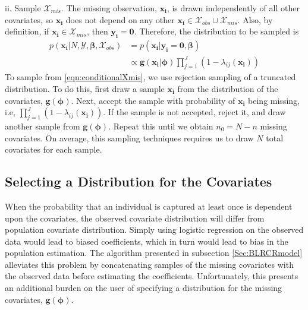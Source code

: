 \documentclass[
  12pt,
]{article}
\begin{document}
\begin{list}{}{}
\begin{list}{}{}
  
  \item[ii.] Sample $\mathcal{X}_{mis}$.   The missing observation, $\boldsymbol{x_i}$, is drawn independently of all other covariates, so $\boldsymbol{x_i}$ does not depend on any other $\boldsymbol{x_i} \in \mathcal{X}_{obs}\cup \mathcal{X}_{mis} $.  Also, by definition, if $\boldsymbol{x_i} \in \mathcal{X}_{mis}$, then $\boldsymbol{y_i} = \boldsymbol{0}$. Therefore, the distribution to be sampled is
  \begin{align}
  \label{eqn:conditionalXmis}
  \nonumber p(\boldsymbol{x_i}|N,\mathcal{Y},\boldsymbol{\beta},\mathcal{X}_{obs})&=p(\boldsymbol{x_i} |\boldsymbol{y_i}=\boldsymbol{0},\boldsymbol{\beta})\\
  &\propto \boldsymbol{g}(\boldsymbol{x_i}|\boldsymbol{\phi})\prod_{j=1}^J (1-\lambda_{ij}(\boldsymbol{x_i}))
  \end{align}
To sample from \autoref{eqn:conditionalXmis}, we use rejection sampling of a truncated distribution.  To do this, first draw a sample $\boldsymbol{x_i}$ from the distribution of the covariates, $\boldsymbol{g}(\boldsymbol{\phi})$. Next, accept the sample with probability of $\boldsymbol{x_i}$ being missing, i.e, $\prod_{j=1}^J (1-\lambda_{ij}(\boldsymbol{x_i}))$.  If the sample is not accepted, reject it, and draw another sample from $\boldsymbol{g}(\boldsymbol{\phi})$. Repeat this until we obtain $n_0 = N - n$ missing covariates.  On average, this sampling techniques requires us to draw $N$ total covariates for each sample.
  
  \end{list}
  
  

\end{list}

\subsection{Selecting a Distribution for the Covariates}
\label{Sec:selectcovariates}

When the probability that an individual is captured at least once is
dependent upon the covariates, the observed covariate distribution will
differ from population covariate distribution. Simply using logistic
regression on the observed data would lead to biased coefficients, which
in turn would lead to bias in the population estimation. The algorithm
presented in subsection \ref{Sec:BLRCRmodel} alleviates this problem by
concatenating samples of the missing covariates with the observed data
before estimating the coefficients. Unfortunately, this presents an
additional burden on the user of specifying a distribution for the
missing covariates, \(\boldsymbol{g}(\boldsymbol{\phi})\).
\end{document}
